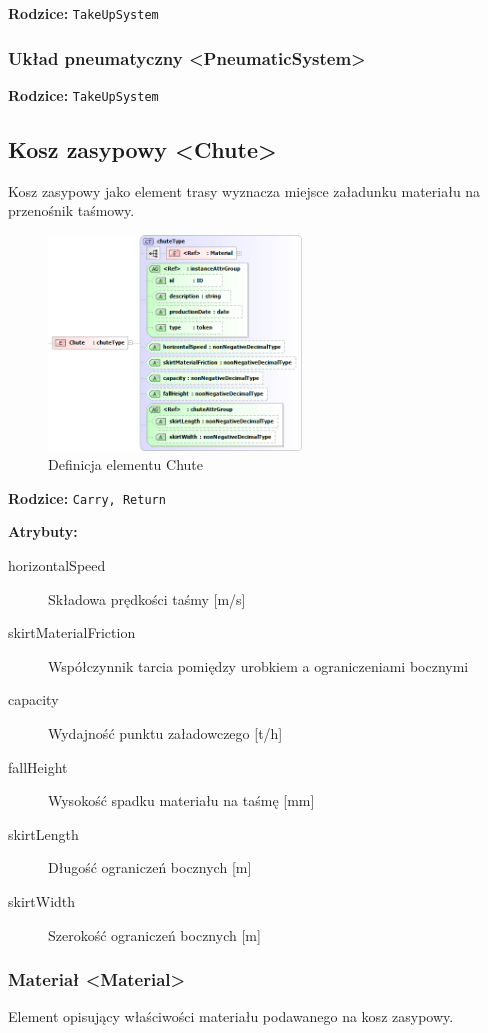 \documentclass[12pt,a4paper]{article}
\begin{document}
\noindent\textbf{Rodzice:} \texttt{TakeUpSystem}


\subsubsection{Układ pneumatyczny <PneumaticSystem>}

\noindent\textbf{Rodzice:} \texttt{TakeUpSystem}

\subsection{Kosz zasypowy <Chute>}
Kosz zasypowy jako element trasy wyznacza miejsce załadunku materiału na
przenośnik taśmowy.

\begin{figure}[H]
  \centering
  \includegraphics[width=0.6\textwidth]{png/liquid/Chute}
  \caption{Definicja elementu Chute}
  \label{fig:chute-xsd}
\end{figure}

\noindent\textbf{Rodzice:} \texttt{Carry, Return}

\noindent\textbf{Atrybuty:}
\begin{description}
\item[horizontalSpeed] Składowa prędkości taśmy [m/s]
\item[skirtMaterialFriction] Współczynnik tarcia pomiędzy urobkiem a
  ograniczeniami bocznymi
\item[capacity] Wydajność punktu załadowczego [t/h]
\item[fallHeight] Wysokość spadku materiału na taśmę [mm]
\item[skirtLength] Długość ograniczeń bocznych [m]
\item[skirtWidth] Szerokość ograniczeń bocznych [m]
\end{description}


\subsubsection{Materiał <Material>}
Element opisujący właściwości materiału podawanego na kosz zasypowy.
\end{document}
